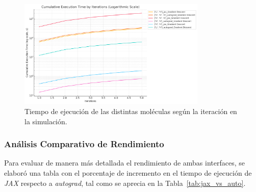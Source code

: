 \begin{figure}[H]
  \centering
  \includegraphics[width=0.8\textwidth]{img/time_iterations.png}
  \caption{Tiempo de ejecución de las distintas moléculas según la iteración en la simulación.}
  \label{fig:time_iterations}
\end{figure}

\subsubsection{Análisis Comparativo de Rendimiento}
Para evaluar de manera más detallada el rendimiento de ambas interfaces, se elaboró una tabla con el porcentaje de incremento en el tiempo de ejecución de \textit{JAX} respecto a \textit{autograd}, tal como se aprecia en la Tabla~\ref{tab:jax_vs_auto}.

\begin{table}[H]
  \centering
  \scriptsize
  \caption{Comparación de tiempos de ejecución entre las interfaces JAX y autograd para diferentes moléculas.}
  \label{tab:jax_vs_auto}
\end{table}

